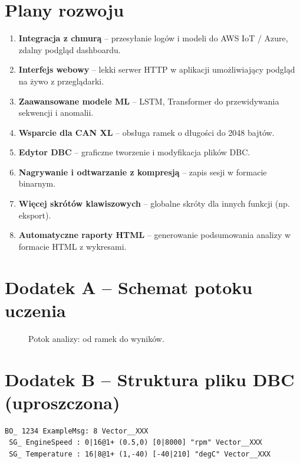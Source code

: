 \documentclass[a4paper,12pt,polish]{article}
\begin{document}
\section{Plany rozwoju}
\label{sec:roadmap}

\begin{enumerate}[noitemsep]
  \item \textbf{Integracja z chmurą} – przesyłanie logów i modeli do AWS IoT / Azure, zdalny podgląd dashboardu.
  \item \textbf{Interfejs webowy} – lekki serwer HTTP w aplikacji umożliwiający podgląd na żywo z przeglądarki.
  \item \textbf{Zaawansowane modele ML} – LSTM, Transformer do przewidywania sekwencji i anomalii.
  \item \textbf{Wsparcie dla CAN XL} – obsługa ramek o długości do 2048 bajtów.
  \item \textbf{Edytor DBC} – graficzne tworzenie i modyfikacja plików DBC.
  \item \textbf{Nagrywanie i odtwarzanie z kompresją} – zapis sesji w formacie binarnym.
  \item \textbf{Więcej skrótów klawiszowych} – globalne skróty dla innych funkcji (np. eksport).
  \item \textbf{Automatyczne raporty HTML} – generowanie podsumowania analizy w formacie HTML z wykresami.
\end{enumerate}

\section*{Dodatek A – Schemat potoku uczenia}
\begin{figure}[H]
\centering
{}
\caption{Potok analizy: od ramek do wyników.}
\label{fig:pipeline}
\end{figure}

\section*{Dodatek B – Struktura pliku DBC (uproszczona)}
\begin{lstlisting}[caption={Fragment pliku DBC}]
BO_ 1234 ExampleMsg: 8 Vector__XXX
 SG_ EngineSpeed : 0|16@1+ (0.5,0) [0|8000] "rpm" Vector__XXX
 SG_ Temperature : 16|8@1+ (1,-40) [-40|210] "degC" Vector__XXX
\end{lstlisting}
\end{document}
